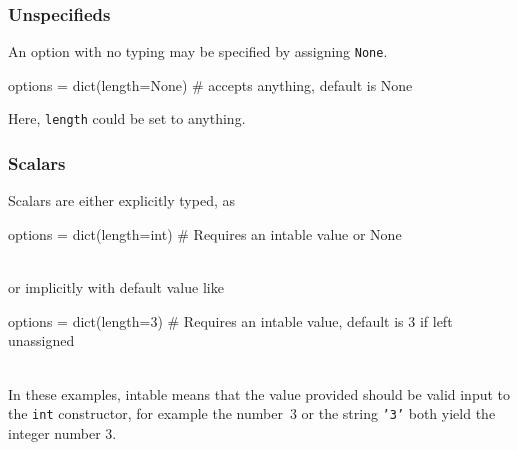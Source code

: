 \subsubsection{Unspecifieds}
An option with no typing may be specified by assigning \texttt{None}.
\\
\begin{python}
  options = dict(length=None)
  # accepts anything, default is None
\end{python}
Here, \texttt{length} could be set to anything.



\subsubsection*{Scalars}
Scalars are either explicitly typed, as
\\
\begin{python}
  options = dict(length=int)
  # Requires an intable value or None
\end{python}
\\
or implicitly with default value like

\begin{python}
  options = dict(length=3)
  # Requires an intable value, default is 3 if left unassigned
\end{python}
\\
In these examples, intable means that the value provided should be
valid input to the \texttt{int} constructor, for example the number~3
or the string \texttt{'3'} both yield the integer number 3.



